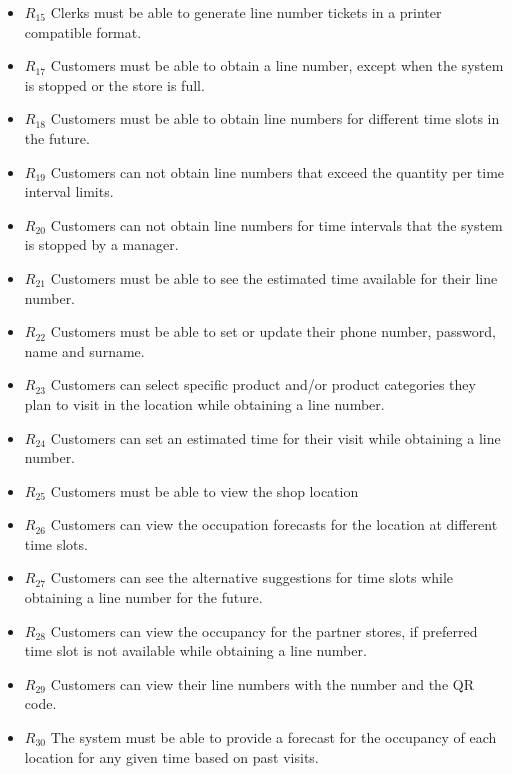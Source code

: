 \begin{itemize}
    \item \textbf{$R_{15}$} Clerks must be able to generate line number tickets in a printer compatible format.
    \item \textbf{$R_{17}$} Customers must be able to obtain a line number, except when the system is stopped or the store is full.
    \item \textbf{$R_{18}$} Customers must be able to obtain line numbers for different time slots in the future.
    \item \textbf{$R_{19}$} Customers can not obtain line numbers that exceed the quantity per time interval limits.
    \item \textbf{$R_{20}$} Customers can not obtain line numbers for time intervals that the system is stopped by a manager.
    \item \textbf{$R_{21}$} Customers must be able to see the estimated time available for their line number.
    \item \textbf{$R_{22}$} Customers must be able to set or update their phone number, password, name and surname.
    \item \textbf{$R_{23}$} Customers can select specific product and/or product categories they plan to visit in the location while obtaining a line number.
    \item \textbf{$R_{24}$} Customers can set an estimated time for their visit while obtaining a line number.
    \item \textbf{$R_{25}$} Customers must be able to view the shop location
    \item \textbf{$R_{26}$} Customers can view the occupation forecasts for the location at different time slots.
    \item \textbf{$R_{27}$} Customers can see the alternative suggestions for time slots while obtaining a line number for the future.
    \item \textbf{$R_{28}$} Customers can view the occupancy for the partner stores, if preferred time slot is not available while obtaining a line number.
    \item \textbf{$R_{29}$} Customers can view their line numbers with the number and the QR code.
    \item \textbf{$R_{30}$} The system must be able to provide a forecast for the occupancy of each location for any given time based on past visits.
\end{itemize}



